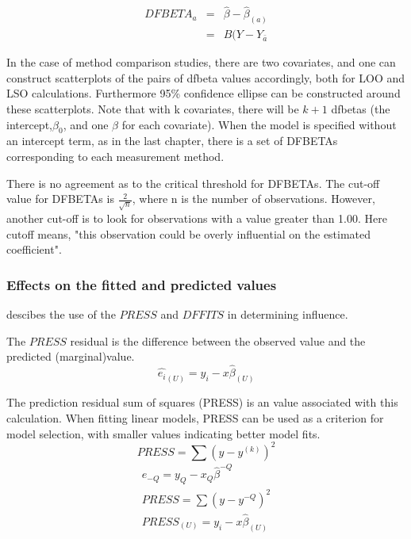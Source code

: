 \documentclass[12pt, a4paper]{report}
\theoremstyle{plain}
\theoremstyle{definition}
\theoremstyle{remark}
\begin{document}
	
	
	\begin{eqnarray}
	DFBETA_{a} &=& \hat{\beta} - \hat{\beta}_{(a)} \\
	&=& B(Y-Y_{\bar{a}}
	\end{eqnarray}
	
	In the case of method comparison studies, there are two covariates, and one can construct scatterplots of the pairs of dfbeta values accordingly, both for LOO and LSO calculations. Furthermore 95\% confidence ellipse can be constructed around these scatterplots.
	Note that with k covariates, there will be $k+1$ dfbetas (the intercept,$\beta_0$, and one $\beta$ for each covariate). When the model is specified without an intercept term, as in the last chapter, there is a set of DFBETAs corresponding to each measurement method.
	
	
	
	
	There is no agreement as to the critical threshold for DFBETAs. The cut-off value for DFBETAs is $\frac{2}{\sqrt{n}}$, where n is the number of observations.
	However, another cut-off is to look for observations with a value greater than 1.00. Here cutoff means,
	"this observation could be overly influential on the estimated coefficient".
	

	\subsubsection{Effects on the fitted and predicted values}
	\citet{schabenberger} descibes the use of the $PRESS$ and $DFFITS$ in determining influence.
	
	The $PRESS$ residual is the difference between the observed value and the predicted (marginal)value.
	\begin{equation}
	\hat{e_{i}}_{(U)} = y_{i} - x\hat{\beta}_{(U)}
	\end{equation}
	
	The prediction residual sum of squares (PRESS) is an value associated with this calculation. When fitting linear models, PRESS can be used as a criterion for model selection, with smaller values indicating better model fits.
	\begin{equation}
	PRESS = \sum(y-y^{(k)})^2
	\end{equation}
	\begin{eqnarray*}
		e_{-Q} = y_{Q} - x_{Q}\hat{\beta}^{-Q}\\
		PRESS = \sum(y-y^{-Q})^2\\
		PRESS_{(U)} = y_{i} - x\hat{\beta}_{(U)}\\
	\end{eqnarray*}
	
\end{document}
